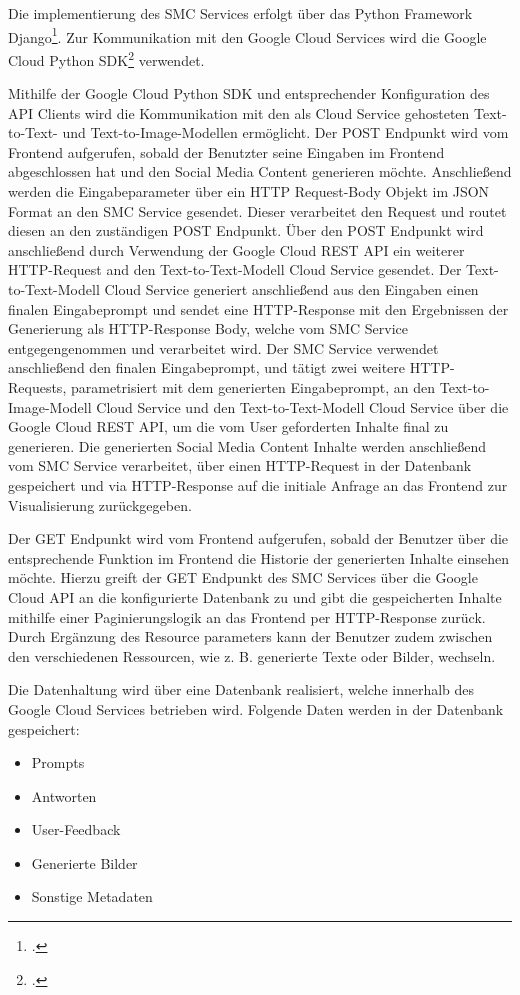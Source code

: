 Die implementierung des \ac{SMC} Services erfolgt über das Python Framework Django\footcite{djangoproject}.
Zur Kommunikation mit den Google Cloud Services wird die Google Cloud Python SDK\footcite{googlecloudpython} verwendet.

Mithilfe der Google Cloud Python \ac{SDK} und entsprechender Konfiguration des API Clients wird die Kommunikation mit den als Cloud Service gehosteten Text-to-Text- und Text-to-Image-Modellen ermöglicht.
Der POST Endpunkt wird vom Frontend aufgerufen, sobald der Benutzter seine Eingaben im Frontend abgeschlossen hat und den Social Media Content generieren möchte.
Anschließend werden die Eingabeparameter über ein \ac{HTTP} Request-Body Objekt im \ac{JSON} Format an den \ac{SMC} Service gesendet.
Dieser verarbeitet den Request und routet diesen an den zuständigen POST Endpunkt.
Über den POST Endpunkt wird anschließend durch Verwendung der Google Cloud \ac{REST} \ac{API} ein weiterer \ac{HTTP}-Request and den Text-to-Text-Modell Cloud Service gesendet.
Der Text-to-Text-Modell Cloud Service generiert anschließend aus den Eingaben einen finalen Eingabeprompt und sendet eine \ac{HTTP}-Response mit den Ergebnissen der Generierung als HTTP-Response Body, welche vom \ac{SMC} Service entgegengenommen und verarbeitet wird.
Der \ac{SMC} Service verwendet anschließend den finalen Eingabeprompt, und tätigt zwei weitere \ac{HTTP}-Requests, parametrisiert mit dem generierten Eingabeprompt, an den Text-to-Image-Modell Cloud Service und den Text-to-Text-Modell Cloud Service über die Google Cloud \ac{REST} \ac{API}, um die vom User geforderten Inhalte final zu generieren.
Die generierten Social Media Content Inhalte werden anschließend vom \ac{SMC} Service verarbeitet, über einen \ac{HTTP}-Request in der Datenbank gespeichert und via \ac{HTTP}-Response auf die initiale Anfrage an das Frontend zur Visualisierung zurückgegeben.

Der GET Endpunkt wird vom Frontend aufgerufen, sobald der Benutzer über die entsprechende Funktion im Frontend die Historie der generierten Inhalte einsehen möchte.
Hierzu greift der GET Endpunkt des \ac{SMC} Services über die Google Cloud \ac{API} an die konfigurierte Datenbank zu und gibt die gespeicherten Inhalte mithilfe einer Paginierungslogik an das Frontend per \ac{HTTP}-Response zurück.
Durch Ergänzung des Resource parameters kann der Benutzer zudem zwischen den verschiedenen Ressourcen, wie z. B. generierte Texte oder Bilder, wechseln.

Die Datenhaltung wird über eine Datenbank realisiert, welche innerhalb des Google Cloud Services betrieben wird.
Folgende Daten werden in der Datenbank gespeichert:
\begin{itemize}
    \item Prompts
    \item Antworten
    \item User-Feedback
    \item Generierte Bilder
    \item Sonstige Metadaten
\end{itemize}

